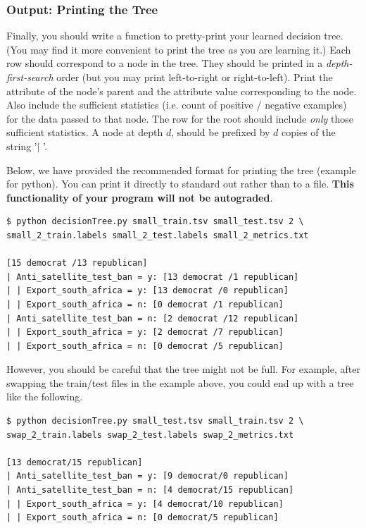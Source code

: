 \documentclass[11pt]{article}
\numberwithin{equation}{section} %
\numberwithin{figure}{section} %
\numberwithin{table}{section} %
\begin{document}
\subsubsection{Output: Printing the Tree}
\label{sec:printtree}

Finally, you should write a function to pretty-print your learned decision tree. (You may find it more convenient to print the tree \emph{as} you are learning it.) Each row should correspond to a node in the tree. They should be printed in a \emph{depth-first-search} order (but you may print left-to-right or right-to-left). Print the attribute of the node's parent and the attribute value corresponding to the node. Also include the sufficient statistics (i.e. count of positive / negative examples) for the data passed to that node. The row for the root should include \emph{only} those sufficient statistics. A node at depth $d$, should be prefixed by $d$ copies of the string '$\mid$ '.

Below, we have provided the recommended format for printing the tree (example for python). You can print it directly to standard out rather than to a file. \textbf{This functionality of your program will not be autograded}.

\begin{lstlisting}[language=Shell]
$ python decisionTree.py small_train.tsv small_test.tsv 2 \ 
small_2_train.labels small_2_test.labels small_2_metrics.txt

[15 democrat /13 republican]
| Anti_satellite_test_ban = y: [13 democrat /1 republican]
| | Export_south_africa = y: [13 democrat /0 republican]
| | Export_south_africa = n: [0 democrat /1 republican]
| Anti_satellite_test_ban = n: [2 democrat /12 republican]
| | Export_south_africa = y: [2 democrat /7 republican]
| | Export_south_africa = n: [0 democrat /5 republican]
\end{lstlisting}

However, you should be careful that the tree might not be full. For example, after swapping the train/test files in the example above, you could end up with a tree like the following.

\begin{lstlisting}[language=Shell]
$ python decisionTree.py small_test.tsv small_train.tsv 2 \ 
swap_2_train.labels swap_2_test.labels swap_2_metrics.txt

[13 democrat/15 republican]
| Anti_satellite_test_ban = y: [9 democrat/0 republican]
| Anti_satellite_test_ban = n: [4 democrat/15 republican]
| | Export_south_africa = y: [4 democrat/10 republican]
| | Export_south_africa = n: [0 democrat/5 republican]
\end{lstlisting}
\end{document}
